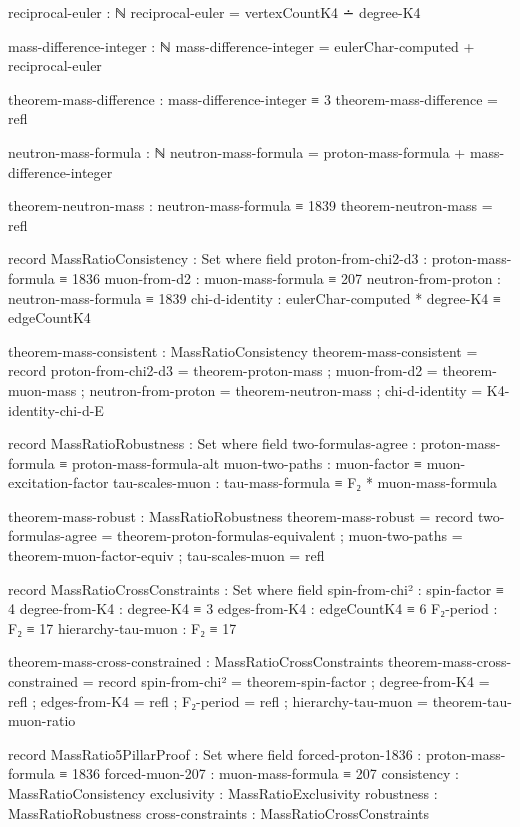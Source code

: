 \documentclass[11pt,a4paper]{book}
\begin{document}
\begin{code}
reciprocal-euler : ℕ
reciprocal-euler = vertexCountK4 ∸ degree-K4

mass-difference-integer : ℕ
mass-difference-integer = eulerChar-computed + reciprocal-euler

theorem-mass-difference : mass-difference-integer ≡ 3
theorem-mass-difference = refl

neutron-mass-formula : ℕ
neutron-mass-formula = proton-mass-formula + mass-difference-integer

theorem-neutron-mass : neutron-mass-formula ≡ 1839
theorem-neutron-mass = refl

record MassRatioConsistency : Set where
  field
    proton-from-chi2-d3 : proton-mass-formula ≡ 1836
    muon-from-d2       : muon-mass-formula ≡ 207
    neutron-from-proton : neutron-mass-formula ≡ 1839
    chi-d-identity     : eulerChar-computed * degree-K4 ≡ edgeCountK4

theorem-mass-consistent : MassRatioConsistency
theorem-mass-consistent = record
  { proton-from-chi2-d3 = theorem-proton-mass
  ; muon-from-d2 = theorem-muon-mass
  ; neutron-from-proton = theorem-neutron-mass
  ; chi-d-identity = K4-identity-chi-d-E
  }

record MassRatioRobustness : Set where
  field
    two-formulas-agree : proton-mass-formula ≡ proton-mass-formula-alt
    muon-two-paths     : muon-factor ≡ muon-excitation-factor
    tau-scales-muon    : tau-mass-formula ≡ F₂ * muon-mass-formula

theorem-mass-robust : MassRatioRobustness
theorem-mass-robust = record
  { two-formulas-agree = theorem-proton-formulas-equivalent
  ; muon-two-paths = theorem-muon-factor-equiv
  ; tau-scales-muon = refl
  }

record MassRatioCrossConstraints : Set where
  field
    spin-from-chi²      : spin-factor ≡ 4
    degree-from-K4      : degree-K4 ≡ 3
    edges-from-K4       : edgeCountK4 ≡ 6
    F₂-period          : F₂ ≡ 17
    hierarchy-tau-muon  : F₂ ≡ 17

theorem-mass-cross-constrained : MassRatioCrossConstraints
theorem-mass-cross-constrained = record
  { spin-from-chi² = theorem-spin-factor
  ; degree-from-K4 = refl
  ; edges-from-K4 = refl
  ; F₂-period = refl
  ; hierarchy-tau-muon = theorem-tau-muon-ratio
  }

record MassRatio5PillarProof : Set where
  field
    forced-proton-1836   : proton-mass-formula ≡ 1836
    forced-muon-207      : muon-mass-formula ≡ 207
    consistency          : MassRatioConsistency
    exclusivity          : MassRatioExclusivity
    robustness           : MassRatioRobustness
    cross-constraints    : MassRatioCrossConstraints


\end{code}
\end{document}
